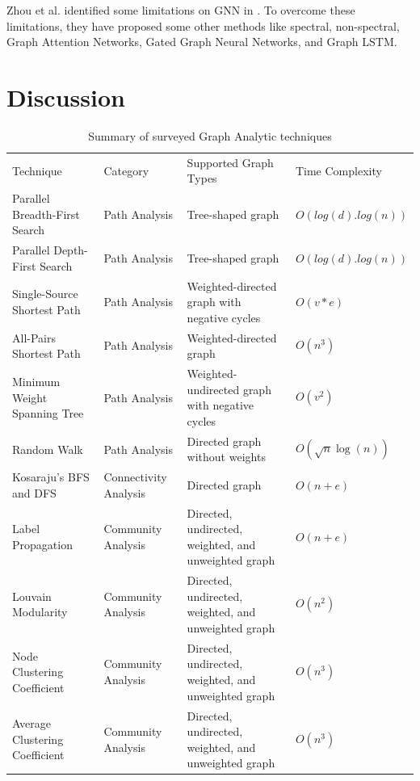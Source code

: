 \documentclass[journal,twoside,web]{ieeecolor}
\begin{document}
Zhou et al. identified some limitations on GNN in \cite{60}. To overcome these limitations, they have proposed some other methods like spectral, non-spectral, Graph Attention Networks, Gated Graph Neural Networks, and Graph LSTM. 

\section{Discussion}
\label{sec:discussion}
\begin{table}[]
    \caption{Summary of surveyed Graph Analytic techniques}
    \label{tab:summary}
	\centering
    \begin{tabular}{l l l l}
    \toprule
    \multirow{2}{*}{Technique} & \multirow{2}{*}{Category} & \multirow{2}{*}{Supported Graph Types}  & \multirow{2}{*}{Time Complexity}\\ 
    &&& \\ \midrule
    Parallel Breadth-First Search & Path Analysis & Tree-shaped graph & $O(log(d).log(n))$ \\ \midrule
    Parallel Depth-First Search & Path Analysis & Tree-shaped graph & $O(log(d).log(n))$  \\ \midrule
    Single-Source Shortest Path & Path Analysis & Weighted-directed graph with negative cycles & $O(v * e)$  \\ \midrule
    All-Pairs Shortest Path & Path Analysis & Weighted-directed graph & $O(n^3)$  \\ \midrule
    Minimum Weight Spanning Tree & Path Analysis & Weighted-undirected graph with negative cycles & $O(v^2)$  \\ \midrule
    Random Walk & Path Analysis & Directed graph without weights & $O(\sqrt{n}\log(n))$  \\ \midrule
    Kosaraju's BFS and DFS & Connectivity Analysis & Directed graph & $O(n + e)$  \\ \midrule
    Label Propagation & Community Analysis & Directed, undirected, weighted, and unweighted graph & $O(n + e)$  \\ \midrule
    Louvain Modularity & Community Analysis & Directed, undirected, weighted, and unweighted graph & $O(n^2)$  \\ \midrule
    Node Clustering Coefficient & Community Analysis & Directed, undirected, weighted, and unweighted graph & $O(n^3)$  \\ \midrule
    Average Clustering Coefficient & Community Analysis & Directed, undirected, weighted, and unweighted graph & $O(n^3)$  \\ \midrule

\end{tabular}
\end{table}
\end{document}
